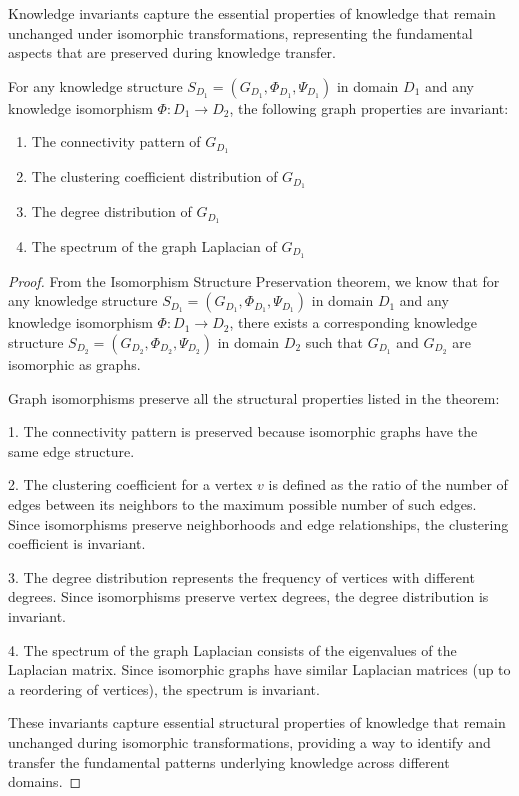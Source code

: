 Knowledge invariants capture the essential properties of knowledge that remain unchanged under isomorphic transformations, representing the fundamental aspects that are preserved during knowledge transfer.

\begin{theorem}
For any knowledge structure $S_{D_1} = (G_{D_1}, \Phi_{D_1}, \Psi_{D_1})$ in domain $D_1$ and any knowledge isomorphism $\Phi: D_1 \to D_2$, the following graph properties are invariant:
\begin{enumerate}
    \item The connectivity pattern of $G_{D_1}$
    \item The clustering coefficient distribution of $G_{D_1}$
    \item The degree distribution of $G_{D_1}$
    \item The spectrum of the graph Laplacian of $G_{D_1}$
\end{enumerate}
\end{theorem}

\begin{proof}
From the Isomorphism Structure Preservation theorem, we know that for any knowledge structure $S_{D_1} = (G_{D_1}, \Phi_{D_1}, \Psi_{D_1})$ in domain $D_1$ and any knowledge isomorphism $\Phi: D_1 \to D_2$, there exists a corresponding knowledge structure $S_{D_2} = (G_{D_2}, \Phi_{D_2}, \Psi_{D_2})$ in domain $D_2$ such that $G_{D_1}$ and $G_{D_2}$ are isomorphic as graphs.

Graph isomorphisms preserve all the structural properties listed in the theorem:

1. The connectivity pattern is preserved because isomorphic graphs have the same edge structure.

2. The clustering coefficient for a vertex $v$ is defined as the ratio of the number of edges between its neighbors to the maximum possible number of such edges. Since isomorphisms preserve neighborhoods and edge relationships, the clustering coefficient is invariant.

3. The degree distribution represents the frequency of vertices with different degrees. Since isomorphisms preserve vertex degrees, the degree distribution is invariant.

4. The spectrum of the graph Laplacian consists of the eigenvalues of the Laplacian matrix. Since isomorphic graphs have similar Laplacian matrices (up to a reordering of vertices), the spectrum is invariant.

These invariants capture essential structural properties of knowledge that remain unchanged during isomorphic transformations, providing a way to identify and transfer the fundamental patterns underlying knowledge across different domains.
\end{proof}

